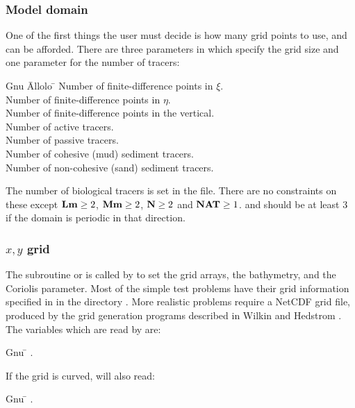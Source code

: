 \subsubsection{Model domain}
\label{Muddy}
One of the first things the user must decide is how many grid points
to use, and can be afforded.  There are three parameters in
 which specify the grid size and one parameter for the
number of tracers:
\begin{tabbing}
  Gnu \= Allolo \= \kill
  \>  \> Number of finite-difference points in $\xi$. \\
  \>  \> Number of finite-difference points in $\eta$. \\
  \>  \> Number of finite-difference points in the vertical. \\
  \>  \> Number of active tracers. \\
  \>  \> Number of passive tracers. \\
  \>  \> Number of cohesive (mud) sediment tracers. \\
  \>  \> Number of non-cohesive (sand) sediment tracers.
\end{tabbing}
The number of biological tracers is set in the  file.
There are no constraints on these except $\mbox{\bf Lm} \geq 2$, $\mbox{\bf Mm}
\geq 2$, $\mbox{\bf N} \geq 2$ and $\mbox{\bf NAT} \geq 1$.   and
 should be at least 3 if the domain is periodic in that
direction.

\subsubsection{$x,y$ grid}
The subroutine  or  is called by
 to set the grid arrays, the bathymetry, and the
Coriolis parameter.  Most of the simple test problems have their grid
information specified in  in the directory
.  More realistic problems require a NetCDF grid
file, produced by the grid generation programs described in Wilkin and
Hedstrom \cite{GRIDS}.  The variables which are read by
 are:
\begin{tabbing}
  Gnu \= \kill
  \> .
\end{tabbing}
If the grid is curved,  will also read:
\begin{tabbing}
  Gnu \= \kill
  \> .
\end{tabbing}

